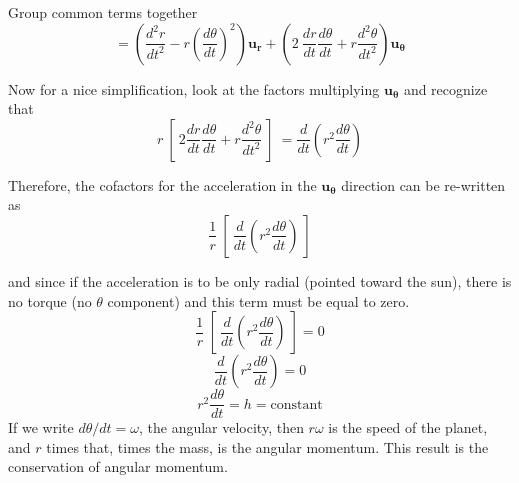 \documentclass[11pt, oneside]{article}
\begin{document}
Group common terms together
\[ = (\frac{d^2r}{dt^2} - r (\frac{d\theta}{dt})^2 ) \mathbf{u_r}  + (2 \ \frac{dr}{dt} \frac{d\theta}{dt} + r \frac{d^2\theta}{dt^2}) \mathbf{u_{\theta}}  \]

Now for a nice simplification, look at the factors multiplying $\mathbf{u_{\theta}}$ and recognize that
\[ r \ [ \ 2 \frac{dr}{dt} \frac{d\theta}{dt} + r \frac{d^2\theta}{dt^2} \ ] \  = \frac{d}{dt} ( r^2 \frac{d\theta}{dt}) \]

Therefore, the cofactors for the acceleration in the $\mathbf{u_{\theta}}$ direction can be re-written as
\[ \frac{1}{r} \ [ \ \frac{d}{dt} ( r^2 \frac{d\theta}{dt}) \ ] \]

and since if the acceleration is to be only radial (pointed toward the sun), there is no torque (no $\theta$ component) and this term must be equal to zero.
\[ \frac{1}{r} \ [ \ \frac{d}{dt} ( r^2 \frac{d\theta}{dt}) \ ]  = 0 \]
\[ \frac{d}{dt} ( r^2 \frac{d\theta}{dt}) = 0 \]
\[ r^2 \frac{d\theta}{dt} = h = \text{constant} \]
If we write $d\theta/dt = \omega$, the angular velocity, then $r \omega$ is the speed of the planet, and $r$ times that, times the mass, is the angular momentum.  This result is the conservation of angular momentum.
\end{document}
